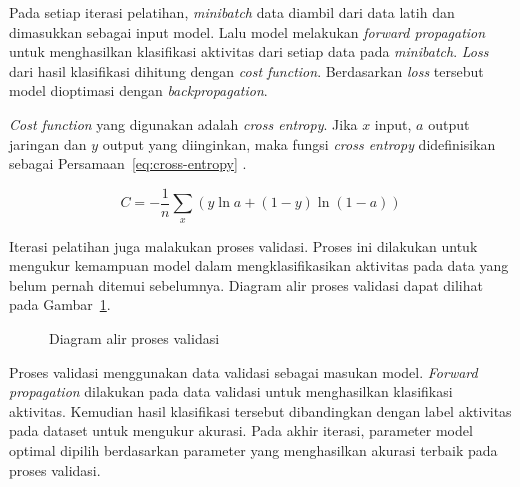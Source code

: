 Pada setiap iterasi pelatihan, \textit{minibatch} data diambil dari data latih dan dimasukkan sebagai input model. Lalu model melakukan \textit{forward propagation} untuk menghasilkan klasifikasi aktivitas dari setiap data pada \textit{minibatch}. \textit{Loss} dari hasil klasifikasi dihitung dengan \textit{cost function}. Berdasarkan \textit{loss} tersebut model dioptimasi dengan \textit{backpropagation}.

\textit{Cost function} yang digunakan adalah \textit{cross entropy}. Jika $x$ input, $a$ output jaringan dan $y$ output yang diinginkan, maka fungsi \textit{cross entropy} didefinisikan sebagai Persamaan~\ref{eq:cross-entropy} \Parencite{nielsen-2015}.

\begin{equation}
    C = -\frac{1}{n} \sum_{x}(y \ln{a} + (1 - y) \ln(1 - a))
    \label{eq:cross-entropy}
\end{equation}

Iterasi pelatihan juga malakukan proses validasi. Proses ini dilakukan untuk mengukur kemampuan model dalam mengklasifikasikan aktivitas pada data yang belum pernah ditemui sebelumnya. Diagram alir proses validasi dapat dilihat pada Gambar~\ref{gambar:diagram-alir-validasi}.

\begin{figure}[h]
    \centering
    \caption{Diagram alir proses validasi}
    \label{gambar:diagram-alir-validasi}
\end{figure}

Proses validasi menggunakan data validasi sebagai masukan model. \textit{Forward propagation} dilakukan pada data validasi untuk menghasilkan klasifikasi aktivitas. Kemudian hasil klasifikasi tersebut dibandingkan dengan label aktivitas pada dataset untuk mengukur akurasi. Pada akhir iterasi, parameter model optimal dipilih berdasarkan parameter yang menghasilkan akurasi terbaik pada proses validasi.

